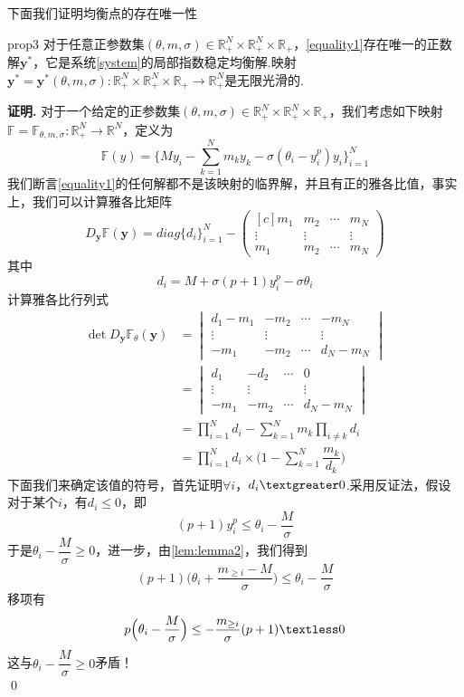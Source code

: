 \documentclass[11pt,a4paper]{article}
\theoremstyle{definition}
\renewenvironment{proof}{\par\textbf{证明.}\;}{\qed\par}
\begin{document}
	下面我们证明均衡点的存在唯一性
	\begin{proposition}{}{prop3}
		对于任意正参数集$(\theta,m,\sigma)\in\mathbb{R}_{+}^{N}\times\mathbb{R}_{+}^{N}\times\mathbb{R}_{+}$，\eqref{equality1}存在唯一的正数解$\textbf{y}^{*}$，它是系统\eqref{system}的局部指数稳定均衡解.映射$\textbf{y}^{*}=\textbf{y}^{*}(\theta,m,\sigma):\mathbb{R}_{+}^{N}\times\mathbb{R}_{+}^{N}\times\mathbb{R}_{+}\rightarrow\mathbb{R}_{+}^{N}$是无限光滑的.
	\end{proposition}
	\begin{proof}
		对于一个给定的正参数集$(\theta,m,\sigma)\in\mathbb{R}_{+}^{N}\times\mathbb{R}_{+}^{N}\times\mathbb{R}_{+}$，我们考虑如下映射$\mathbb{F}=\mathbb{F}_{\theta,m,\sigma}:\mathbb{R}_{+}^{N}\rightarrow\mathbb{R}^{N}$，定义为\[ \mathbb{F}(y)=\Bigg\{My_{i}-\sum_{k=1}^{N}m_{k}y_{k}-\sigma(\theta_{i}-y_{i}^{p})y_{i}\Bigg\}_{i=1}^{N} \]
		我们断言\eqref{equality1}的任何解都不是该映射的临界解，并且有正的雅各比值，事实上，我们可以计算雅各比矩阵\[ D_{\textbf{y}}\mathbb{F}(\textbf{y})=diag\{d_{i}\}_{i=1}^{N}-\begin{pmatrix*}[c]
			m_{1} & m_{2} & \cdots & m_{N} \\
			\vdots & \vdots &  & \vdots \\
			m_{1} & m_{2} & \cdots & m_{N}
		\end{pmatrix*} \]其中\[ d_{i}=M+\sigma(p+1)y_{i}^{p}-\sigma\theta_{i} \]
		计算雅各比行列式
		\begin{align*}
			\det D_{\textbf{y}}\mathbb{F}_{\theta}(\textbf{y}) &=\begin{vmatrix}
				d_{1}-m_{1} & -m_{2} & \cdots & -m_{N} \\
				\vdots& \vdots &  & \vdots \\
				-m_{1}& -m_{2} & \cdots & d_{N}-m_{N}
			\end{vmatrix}\\
			&=\begin{vmatrix}
				d_{1} & -d_{2} & \cdots & 0 \\
				\vdots& \vdots &  & \vdots \\
				-m_{1}& -m_{2} & \cdots & d_{N}-m_{N}
			\end{vmatrix}\\
			&=\prod_{i=1}^{N}d_{i}-\sum_{k=1}^{N}m_{k}\prod_{i\neq k}d_{i}\\
			&=\prod_{i=1}^{N}d_{i}\times\big(1-\sum_{k=1}^{N}\dfrac{m_{k}}{d_{k}}\big)
		\end{align*}
		下面我们来确定该值的符号，首先证明$\forall i$，$d_{i}\textgreater0$.采用反证法，假设对于某个$i$，有$d_{i}\leq0$，即\[ (p+1)y_{i}^{p}\leq\theta_{i}-\dfrac{M}{\sigma} \]于是$\theta_{i}-\dfrac{M}{\sigma}\geq0$，进一步，由\eqref{lem:lemma2}，我们得到\[ (p+1)\Big(\theta_{i}+\dfrac{m_{\geq i}-M}{\sigma}\Big)\leq\theta_{i}-\dfrac{M}{\sigma} \]移项有\[ p\Big(\theta_{i}-\dfrac{M}{\sigma}\Big)\leq-\dfrac{m_{\geq i}}{\sigma}(p+1)\textless0 \]这与$\theta_{i}-\dfrac{M}{\sigma}\geq0$矛盾！\\

\end{proof}
\end{document}
